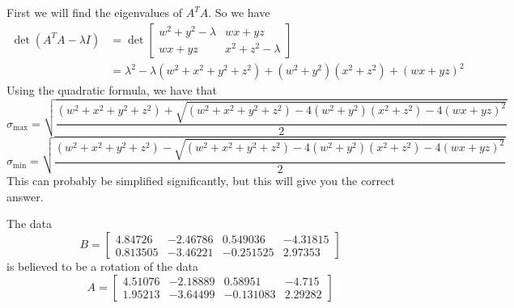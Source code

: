 \documentclass{homework}
\begin{document}
\begin{solution}
  First we will find the eigenvalues of $A^TA$. So we have
  \[ 
    \begin{aligned}
      \det(A^TA - \lambda I) &= \det 
    \begin{bmatrix}
      w^2 + y^2 - \lambda & wx + yz \\
      wx + yz & x^2 + z^2 - \lambda
    \end{bmatrix} \\ 
    &= \lambda^2 - \lambda(w^2 + x^2 + y^2 + z^2) + (w^2 + y^2)(x^2 + z^2) + (wx + yz)^2
    \end{aligned}
  \]
  Using the quadratic formula, we have that
  \[ \sigma_{\max} = \sqrt{\frac{(w^2 + x^2 + y^2 + z^2) + \sqrt{(w^2 + x^2 + y^2 + z^2) - 4(w^2 + y^2)(x^2 + z^2) - 4(wx + yz)^2}}{2}}\]
  \[ \sigma_{\min} = \sqrt{\frac{(w^2 + x^2 + y^2 + z^2) - \sqrt{(w^2 + x^2 + y^2 + z^2) - 4(w^2 + y^2)(x^2 + z^2) - 4(wx + yz)^2}}{2}}\]
  This can probably be simplified significantly, but this will give you the correct answer.
\end{solution}

\begin{problem}[7-15]
  The data
  \[B=
    \begin{bmatrix}
    4.84726 & -2.46786 & 0.549036 & -4.31815 \\
    0.813505 & -3.46221 & -0.251525 & 2.97353
    \end{bmatrix}
  \]
  is believed to be a rotation of the data
  \[A=
    \begin{bmatrix}
    4.51076 & -2.18889 & 0.58951 & -4.715 \\
    1.95213 & -3.64499 & -0.131083 & 2.29282
    \end{bmatrix}
  \]
\end{problem}
\end{document}
